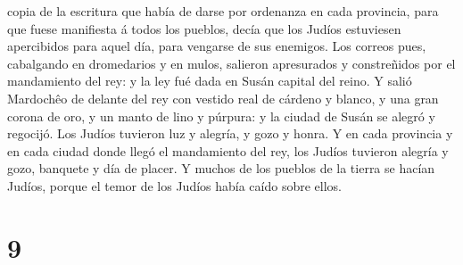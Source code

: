 copia de la escritura que había de darse por ordenanza en cada
provincia, para que fuese manifiesta á todos los pueblos, decía que los
Judíos estuviesen apercibidos para aquel día, para vengarse de sus
enemigos.  Los correos pues, cabalgando en dromedarios y en
mulos, salieron apresurados y constreñidos por el mandamiento del rey: y
la ley fué dada en Susán capital del reino.  Y salió
Mardochêo de delante del rey con vestido real de cárdeno y blanco, y una
gran corona de oro, y un manto de lino y púrpura: y la ciudad de Susán
se alegró y regocijó.  Los Judíos tuvieron luz y alegría, y
gozo y honra.  Y en cada provincia y en cada ciudad donde
llegó el mandamiento del rey, los Judíos tuvieron alegría y gozo,
banquete y día de placer. Y muchos de los pueblos de la tierra se hacían
Judíos, porque el temor de los Judíos había caído sobre ellos.

\hypertarget{section-8}{%
\section{9}\label{section-8}}

